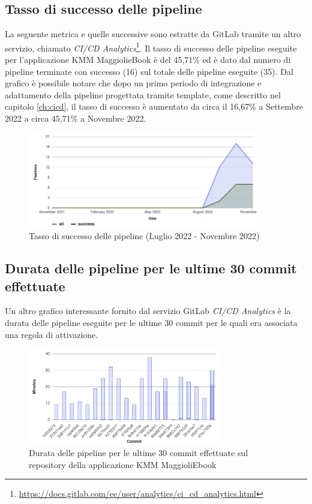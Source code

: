 \subsection*{Tasso di successo delle pipeline}
La seguente metrica e quelle successive sono estratte da GitLab tramite un altro servizio, chiamato \textit{CI/CD Analytics}\footnote{\href{https://docs.gitlab.com/ee/user/analytics/ci\_cd\_analytics.html}{https://docs.gitlab.com/ee/user/analytics/ci\_cd\_analytics.html}}. Il tasso di successo delle pipeline eseguite per l'applicazione KMM MaggiolieBook è del 45,71\% ed è dato dal numero di pipeline terminate con successo (16) sul totale delle pipeline eseguite (35). Dal grafico è possibile notare che dopo un primo periodo di integrazione e adattamento della pipeline progettata tramite template, come descritto nel capitolo \ref{ch:cicd}, il tasso di successo è aumentato da circa il 16,67\% a Settembre 2022 a circa 45,71\% a Novembre 2022.

\begin{figure}[H]
\centering
    \includegraphics[width=0.9\textwidth]{img/gitlab-pipeline-chart.png}
    \caption{Tasso di successo delle pipeline (Luglio 2022 - Novembre 2022)}
    \label{gitlab-pipeline-chart}
\end{figure}

\subsection*{Durata delle pipeline per le ultime 30 commit effettuate}
Un altro grafico interessante fornito dal servizio GitLab \textit{CI/CD Analytics} è la durata delle pipeline eseguite per le ultime 30 commit per le quali era associata una regola di attivazione.

\begin{figure}[H]
\centering
    \includegraphics[width=0.75\textwidth]{img/gitlab-cicd-stats.png}
    \caption{Durata delle pipeline per le ultime 30 commit effettuate sul repository della applicazione KMM MaggioliEbook}
    \label{gitlab-cicd-stats}
\end{figure}

